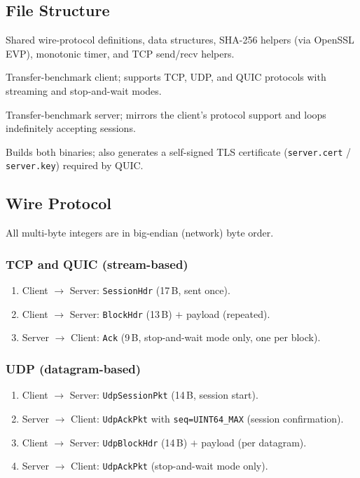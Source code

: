 \documentclass[12pt,a4paper]{article}
\begin{document}
\subsection{File Structure}

\begin{description}[leftmargin=3cm, style=nextline]
  \item[\texttt{common.h}]  Shared wire-protocol definitions, data structures,
        SHA-256 helpers (via OpenSSL EVP), monotonic timer, and TCP
        send/recv helpers.
  \item[\texttt{client.c}]  Transfer-benchmark client; supports TCP, UDP, and
        QUIC protocols with streaming and stop-and-wait modes.
  \item[\texttt{server.c}]  Transfer-benchmark server; mirrors the client's
        protocol support and loops indefinitely accepting sessions.
  \item[\texttt{Makefile}]  Builds both binaries; also generates a self-signed
        TLS certificate (\texttt{server.cert} / \texttt{server.key}) required
        by QUIC.
\end{description}

\subsection{Wire Protocol}

All multi-byte integers are in big-endian (network) byte order.

\subsubsection{TCP and QUIC (stream-based)}

\begin{enumerate}
  \item Client $\to$ Server: \texttt{SessionHdr} (17\,B, sent once).
  \item Client $\to$ Server: \texttt{BlockHdr} (13\,B) $+$ payload (repeated).
  \item Server $\to$ Client: \texttt{Ack} (9\,B, stop-and-wait mode only,
        one per block).
\end{enumerate}

\subsubsection{UDP (datagram-based)}

\begin{enumerate}
  \item Client $\to$ Server: \texttt{UdpSessionPkt} (14\,B, session start).
  \item Server $\to$ Client: \texttt{UdpAckPkt} with \texttt{seq=UINT64\_MAX}
        (session confirmation).
  \item Client $\to$ Server: \texttt{UdpBlockHdr} (14\,B) $+$ payload
        (per datagram).
  \item Server $\to$ Client: \texttt{UdpAckPkt} (stop-and-wait mode only).
\end{enumerate}
\end{document}
